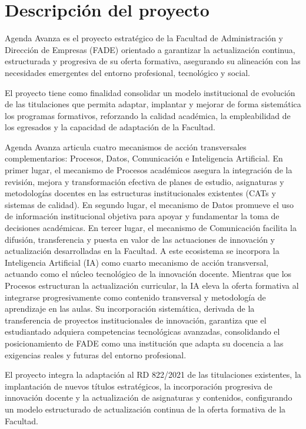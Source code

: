 \documentclass[11pt,a4paper]{scrreprt}
\begin{document}
\section{Descripción del proyecto}

\small
Agenda Avanza es el proyecto estratégico de la Facultad de Administración y Dirección de Empresas (FADE) orientado a garantizar la actualización continua, estructurada y progresiva de su oferta formativa, asegurando su alineación con las necesidades emergentes del entorno profesional, tecnológico y social.

El proyecto tiene como finalidad consolidar un modelo institucional de evolución de las titulaciones que permita adaptar, implantar y mejorar de forma sistemática los programas formativos, reforzando la calidad académica, la empleabilidad de los egresados y la capacidad de adaptación de la Facultad.

Agenda Avanza articula cuatro mecanismos de acción transversales complementarios: Procesos, Datos, Comunicación e Inteligencia Artificial. En primer lugar, el mecanismo de Procesos académicos asegura la integración de la revisión, mejora y transformación efectiva de planes de estudio, asignaturas y metodologías docentes en las estructuras institucionales existentes (CATs y sistemas de calidad). En segundo lugar, el mecanismo de Datos promueve el uso de información institucional objetiva para apoyar y fundamentar la toma de decisiones académicas. En tercer lugar, el mecanismo de Comunicación facilita la difusión, transferencia y puesta en valor de las actuaciones de innovación y actualización desarrolladas en la Facultad. A este ecosistema se incorpora la Inteligencia Artificial (IA) como cuarto mecanismo de acción transversal, actuando como el núcleo tecnológico de la innovación docente. Mientras que los Procesos estructuran la actualización curricular, la IA eleva la oferta formativa al integrarse progresivamente como contenido transversal y metodología de aprendizaje en las aulas. Su incorporación sistemática, derivada de la transferencia de proyectos institucionales de innovación, garantiza que el estudiantado adquiera competencias tecnológicas avanzadas, consolidando el posicionamiento de FADE como una institución que adapta su docencia a las exigencias reales y futuras del entorno profesional.

El proyecto integra la adaptación al RD 822/2021 de las titulaciones existentes, la implantación de nuevos títulos estratégicos, la incorporación progresiva de innovación docente y la actualización de asignaturas y contenidos, configurando un modelo estructurado de actualización continua de la oferta formativa de la Facultad.
\end{document}
